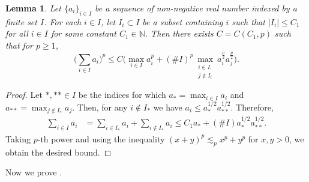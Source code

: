 \documentclass[11pt]{amsart}
\newtheorem{lemma}[theorem]{Lemma}
\theoremstyle{definition}
\theoremstyle{remark}
\newcommand{\N}{\mathbb{N}}
\newcommand{\les}{\lesssim}
\begin{document}
\begin{lemma}\label{lem:BG} Let $\{ a_i \}_{i\in I}$ be a sequence of non-negative real number indexed by a finite set $I$. For each $i\in I$, let $I_i \subset I$ be a subset containing $i$ such that $|I_i| \leq C_1$ for all $i\in I$ for some 
constant $C_1 \in \N$. Then there exists $C=C(C_1,p)$ such that for $p\ge1$,
\[ 
\Big(\sum_{i\in I} a_i\Big)^p \leq C\Big( \max_{i\in I} a_i^p + (\# I )^p\max_{\substack{i\in I,\\ j\notin I_i}} a_i^{\frac p2} a_j^{\frac p2}\Big). \]
\end{lemma}
\begin{proof} 
Let $*, **\in I$ be the indices for which $a_* = \max_{i\in I} a_i$ and $a_{**}=\max_{j\notin I_{*}} a_{j}$. Then, for any $i\notin I_{*}$ we have $a_i \leq a_{*}^{1/2} a_{**}^{1/2}$. Therefore,
\begin{align*}
\sum_{i \in I} a_i &= \sum_{i\in I_{*}} a_i + \sum_{i\notin I_{*}} a_i \leq C_1 a_{*} + (\# I) a_{*}^{1/2} a_{**}^{1/2}.
\end{align*}
Taking $p$-th power and using the inequality $(x+y)^p\les_p x^p+y^p$ for $x,y>0$, we obtain the desired bound.
\end{proof}

Now we prove .
\end{document}
